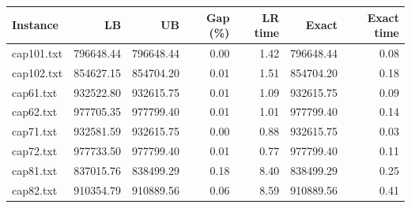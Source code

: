 \begin{tabular}{lrrrrrr}
\toprule
Instance & LB & UB & Gap (\%) & LR time & Exact & Exact time\\
\midrule
cap101.txt & 796648.44 & 796648.44 & 0.00 & 1.42 & 796648.44 & 0.08\\
cap102.txt & 854627.15 & 854704.20 & 0.01 & 1.51 & 854704.20 & 0.18\\
cap61.txt & 932522.80 & 932615.75 & 0.01 & 1.09 & 932615.75 & 0.09\\
cap62.txt & 977705.35 & 977799.40 & 0.01 & 1.01 & 977799.40 & 0.14\\
cap71.txt & 932581.59 & 932615.75 & 0.00 & 0.88 & 932615.75 & 0.03\\
cap72.txt & 977733.50 & 977799.40 & 0.01 & 0.77 & 977799.40 & 0.11\\
cap81.txt & 837015.76 & 838499.29 & 0.18 & 8.40 & 838499.29 & 0.25\\
cap82.txt & 910354.79 & 910889.56 & 0.06 & 8.59 & 910889.56 & 0.41\\
\bottomrule
\end{tabular}
